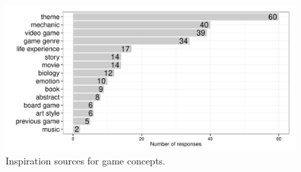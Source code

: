 \documentclass{sig-alternate}
\begin{document}

\begin{figure}[tbph]
\centering
\includegraphics[width=\linewidth]{./inspiration}
\caption{Inspiration sources for game concepts.}
\label{fig:inspiration}
\end{figure}
\end{document}
